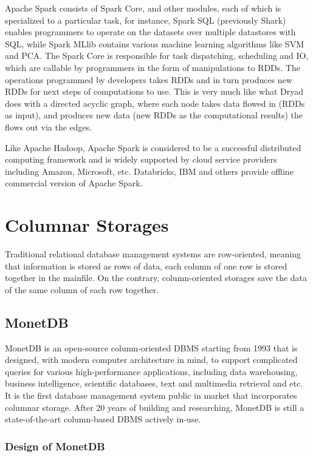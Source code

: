 \documentclass{article}
\begin{document}
Apache Spark consists of Spark Core, and other modules, each of which is specialized to a particular task, for instance, Spark SQL (previously Shark) enables programmers to operate on the datasets over multiple datastores with SQL, while Spark MLlib contains various machine learning algorithms like SVM and PCA.\cite{wiki:spark} The Spark Core is responsible for task dispatching, scheduling and IO, which are callable by programmers in the form of manipulations to RDDs. The operations programmed by developers takes RDDs and in turn produces new RDDs for next steps of computations to use. This is very much like what Dryad does with a directed acyclic graph, where each node takes data flowed in (RDDs as input), and produces new data (new RDDs as the computational results) the flows out via the edges.

Like Apache Hadoop, Apache Spark is considered to be a successful distributed computing framework and is widely supported by cloud service providers including Amazon, Microsoft, etc. Databricks, IBM and others provide offline commercial version of Apache Spark.

\section{Columnar Storages}

Traditional relational database management systems are row-oriented, meaning that information is stored as rows of data, each column of one row is stored together in the mainfile. On the contrary, column-oriented storages save the data of the same column of each row together.

\subsection{MonetDB}

MonetDB is an open-source column-oriented DBMS starting from 1993 that is designed, with modern computer architecture in mind, to support complicated queries for various high-performance applications, including data warehousing, business intelligence, scientific databases, text and multimedia retrieval and etc.\cite{idreos2012monetdb} It is the first database management system public in market that incorporates columnar storage. After 20 years of building and researching, MonetDB is still a state-of-the-art column-based DBMS actively in-use.

\subsubsection{Design of MonetDB}
\end{document}
